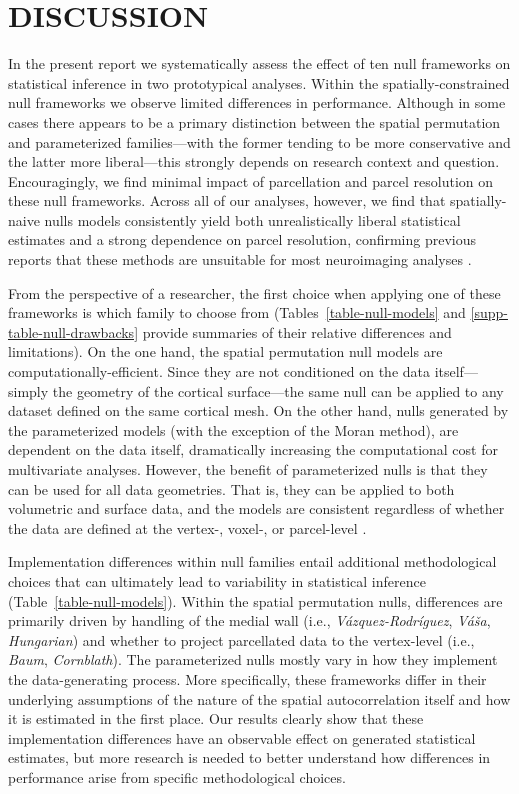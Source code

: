 \documentclass[12pt,aps,pra,reprint,showkeys]{revtex4-1}
\begin{document}
\section*{DISCUSSION}

In the present report we systematically assess the effect of ten null frameworks on statistical inference in two prototypical analyses.
Within the spatially-constrained null frameworks we observe limited differences in performance.
Although in some cases there appears to be a primary distinction between the spatial permutation and parameterized families---with the former tending to be more conservative and the latter more liberal---this strongly depends on research context and question.
Encouragingly, we find minimal impact of parcellation and parcel resolution on these null frameworks.
Across all of our analyses, however, we find that spatially-naive nulls models consistently yield both unrealistically liberal statistical estimates and a strong dependence on parcel resolution, confirming previous reports that these methods are unsuitable for most neuroimaging analyses \citep{alexanderbloch2018neuroimage, burt2020neuroimage}.

From the perspective of a researcher, the first choice when applying one of these frameworks is which family to choose from (Tables~\ref{table-null-models} and \ref{supp-table-null-drawbacks} provide summaries of their relative differences and limitations).
On the one hand, the spatial permutation null models are computationally-efficient.
Since they are not conditioned on the data itself---simply the geometry of the cortical surface---the same null can be applied to any dataset defined on the same cortical mesh.
On the other hand, nulls generated by the parameterized models (with the exception of the Moran method), are dependent on the data itself, dramatically increasing the computational cost for multivariate analyses.
However, the benefit of parameterized nulls is that they can be used for all data geometries.
That is, they can be applied to both volumetric and surface data, and the models are consistent regardless of whether the data are defined at the vertex-, voxel-, or parcel-level \citep{burt2020neuroimage}.

Implementation differences within null families entail additional methodological choices that can ultimately lead to variability in statistical inference (Table~\ref{table-null-models}).
Within the spatial permutation nulls, differences are primarily driven by handling of the medial wall (i.e., \textit{V{\'a}zquez-Rodr{\'i}guez}, \textit{V{\'a}{\v{s}}a}, \textit{Hungarian}) and whether to project parcellated data to the vertex-level (i.e., \textit{Baum}, \textit{Cornblath}).
The parameterized nulls mostly vary in how they implement the data-generating process.
More specifically, these frameworks differ in their underlying assumptions of the nature of the spatial autocorrelation itself and how it is estimated in the first place.
Our results clearly show that these implementation differences have an observable effect on generated statistical estimates, but more research is needed to better understand how differences in performance arise from specific methodological choices.
\end{document}
